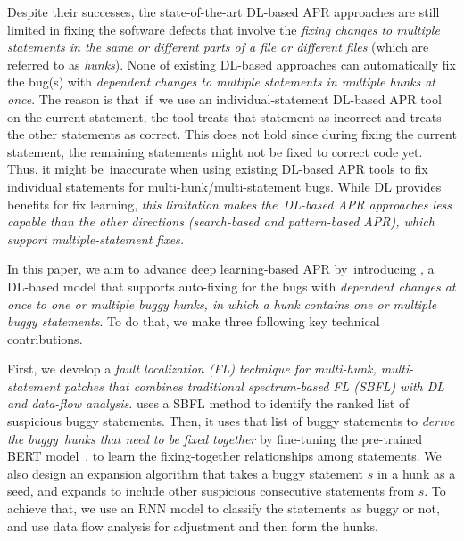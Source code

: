 Despite their successes, the state-of-the-art DL-based APR
  approaches are still limited in fixing the software defects that
involve the {\em fixing changes to multiple statements in the same or
different parts of a file or different files} (which are referred
to as {\em hunks}).
%
None of existing DL-based approaches can automatically fix the bug(s)
with {\em dependent changes to multiple statements in multiple hunks
  at once}.
The reason is that~if~we use an individual-statement DL-based APR tool
on the current statement, the tool treats that statement as
incorrect and treats the other statements as correct. This does not hold
since during fixing the current statement, the remaining statements
might not be fixed to correct code yet. Thus, it might be~inaccurate
when using existing DL-based APR tools to fix individual statements
for multi-hunk/multi-statement bugs.
%
While DL provides benefits for fix learning, {\em this limitation
  makes the~DL-based APR approaches less capable than the other
  directions (search-based and pattern-based APR), which support
  multiple-statement fixes.}

In this paper, we aim to advance deep learning-based APR
by~introducing {\tool}, a DL-based model that supports auto-fixing for
the bugs with {\em dependent changes at once to one or multiple buggy
  hunks, in which a hunk contains one or multiple buggy
statements}. To do that, we make three following key technical
contributions.

First, we develop a {\em fault localization (FL) technique for
  multi-hunk, multi-statement patches that combines traditional
  spectrum-based FL (SBFL) with DL and data-flow analysis}. {\tool}
uses a SBFL method to identify the ranked list of suspicious buggy
statements. Then, it uses that list of buggy statements to {\em derive
  the buggy~hunks that need to be fixed together} by fine-tuning the
pre-trained BERT model~\cite{devlin2018bert}, to learn the
fixing-together relationships among statements.
We also design an expansion algorithm that takes a buggy statement $s$
in a hunk as a seed, and expands to include other suspicious
consecutive statements from $s$. To achieve that, we use an RNN
model to classify the statements as buggy or not, and use data flow
analysis for adjustment and then form the hunks.

